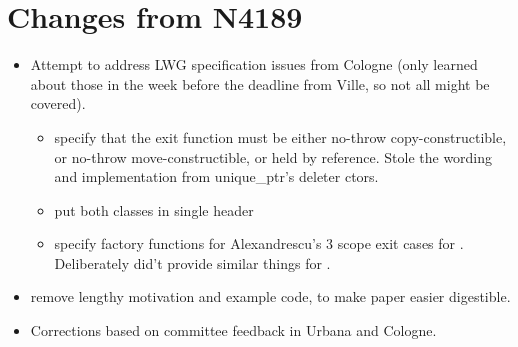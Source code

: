 \documentclass[ebook,11pt,article]{memoir}
\begin{document}
\section{Changes from N4189}
\begin{itemize}
\item Attempt to address LWG specification issues from Cologne (only learned about those in the week before the deadline from Ville, so not all might be covered).
\begin{itemize}
\item specify that the exit function must be either no-throw copy-constructible, or no-throw move-constructible, or held by reference. Stole the wording and implementation from unique_ptr's deleter ctors.
\item put both classes in single header 
\item specify factory functions for Alexandrescu's 3 scope exit cases for . Deliberately did't provide similar things for .
\end{itemize}
\item remove lengthy motivation and example code, to make paper easier digestible.
\item Corrections based on committee feedback in Urbana and Cologne.
\end{itemize}

\end{document}
